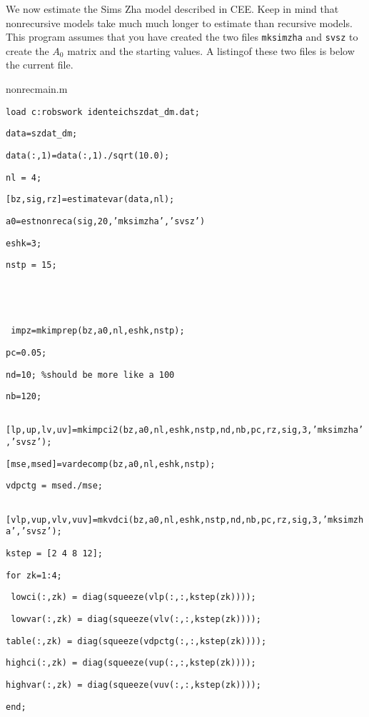 \documentclass{article}
\begin{document}
We now estimate the Sims Zha model described in CEE. Keep in mind that
nonrecursive models take much much longer to estimate than recursive models.
This program assumes that you have created the two files \texttt{mksimzha}
and \texttt{svsz} to create the $A_{0}$ matrix and the starting values. A
listingof these two files is below the current file.

{\Large nonrecmain.m}

\texttt{load c:\TEXTsymbol{\backslash}robswork\TEXTsymbol{\backslash}%
identeich\TEXTsymbol{\backslash}szdat\_dm.dat;}

\texttt{data=szdat\_dm;}

\texttt{data(:,1)=data(:,1)./sqrt(10.0); }

\texttt{nl = 4;}

\texttt{[bz,sig,rz]=estimatevar(data,nl);}

\texttt{a0=estnonreca(sig,20,'mksimzha','svsz')}

\texttt{eshk=3;}

\texttt{nstp = 15;}

\texttt{\ }

\texttt{\ }

\texttt{\ impz=mkimprep(bz,a0,nl,eshk,nstp);}

\texttt{pc=0.05;}

\texttt{nd=10; \%should be more like a 100}

\texttt{nb=120;}

\texttt{%
[lp,up,lv,uv]=mkimpci2(bz,a0,nl,eshk,nstp,nd,nb,pc,rz,sig,3,'mksimzha','svsz');%
}

\texttt{[mse,msed]=vardecomp(bz,a0,nl,eshk,nstp);}

\texttt{vdpctg = msed./mse;}

\texttt{%
[vlp,vup,vlv,vuv]=mkvdci(bz,a0,nl,eshk,nstp,nd,nb,pc,rz,sig,3,'mksimzha','svsz');%
}

\texttt{kstep = [2 4 8 12];}

\texttt{for zk=1:4;}

\texttt{\ lowci(:,zk) = diag(squeeze(vlp(:,:,kstep(zk))));}

\texttt{\ lowvar(:,zk) = diag(squeeze(vlv(:,:,kstep(zk))));}

\texttt{table(:,zk) = diag(squeeze(vdpctg(:,:,kstep(zk))));}

\texttt{highci(:,zk) = diag(squeeze(vup(:,:,kstep(zk))));}

\texttt{highvar(:,zk) = diag(squeeze(vuv(:,:,kstep(zk))));}

\texttt{end;}
\end{document}
